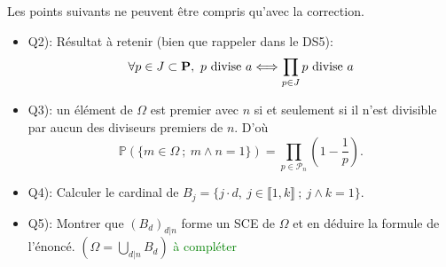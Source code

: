 Les points suivants ne peuvent être compris qu'avec la correction.
\begin{itemize}
    \item Q2): Résultat à retenir (bien que rappeler dans le DS5):\\
    $$\forall p \in J \subset \P,\ p \text{ divise } a \Longleftrightarrow \prod_{p \in J} p \text{ divise } a$$
    \item Q3): un élément de $\Omega$ est premier avec $n$ si et seulement si il n'est divisible par aucun des diviseurs premiers de $n$. D'où
    $$\mathbb{P} \left(\{ m \in \Omega\ ;\ m \wedge n = 1 \} \right) = \prod_{p \in \mathscr{P}_n} \left(1 - \frac{1}{p} \right).$$
    \item Q4): Calculer le cardinal de $B_j = \{ j\cdot d,\ j \in \llbracket 1, k \rrbracket\ ;\ j \wedge k = 1 \}$.
    \item Q5): Montrer que $(B_d)_{d|n}$ forme un SCE de $\Omega$ et en déduire la formule de l'énoncé. $\displaystyle (\Omega = \bigcup_{d|n} B_d)$ \textcolor{green}{à compléter}
\end{itemize}